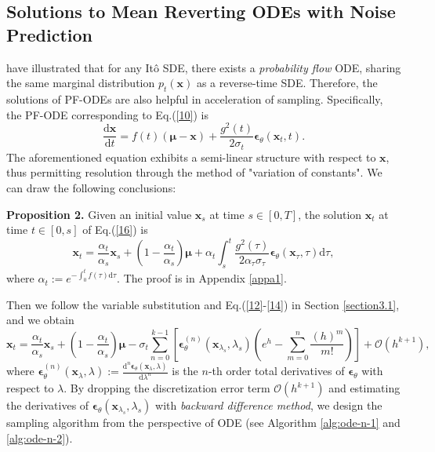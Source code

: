 \subsection{Solutions to Mean Reverting ODEs with Noise Prediction}

\cite{song2020sde} have illustrated that for any Itô SDE, there exists a \textit{probability flow} ODE, sharing the same marginal distribution $p_t(\boldsymbol{x})$ as a reverse-time SDE. Therefore, the solutions of PF-ODEs are also helpful in acceleration of sampling. Specifically, the PF-ODE corresponding to Eq.(\ref{10}) is
\begin{equation}
\frac{\mathrm{d}\boldsymbol{x}}{\mathrm{d}t}=f(t)\left(\boldsymbol{\mu}-\boldsymbol{x}\right)+\frac{g^2(t)}{2\sigma_t}\boldsymbol{\epsilon}_\theta(\boldsymbol{x}_t,t).
\label{16}
\end{equation}
The aforementioned equation exhibits a semi-linear structure with respect to $\boldsymbol{x}$, thus permitting resolution through the method of "variation of constants". We can draw the following conclusions:

\textbf{Proposition 2.} Given an initial value $\boldsymbol{x}_s$ at time $s\in[0,T]$, the solution $\boldsymbol{x}_t$ at time $t\in[0,s]$ of Eq.(\ref{16}) is 
\begin{equation}
\boldsymbol{x}_t=\frac{\alpha_t}{\alpha_s}\boldsymbol{x}_s+\left(1-\frac{\alpha_t}{\alpha_s}\right)\boldsymbol{\mu}+\alpha_t\int_s^t
\frac{g^2(\tau)}{2\alpha_\tau\sigma_\tau}\boldsymbol{\epsilon}_\theta(\boldsymbol{x}_\tau,\tau)\mathrm{d}\tau \label{17},
\end{equation}
where $\alpha_t:=e^{-\int_0^tf(\tau)\mathrm{d}\tau}$. The proof is in Appendix \ref{appa1}.

Then we follow the variable substitution and Eq.(\ref{12}-\ref{14}) in Section \ref{section3.1}, and we obtain
\begin{equation}
\boldsymbol{x}_t=\frac{\alpha_t}{\alpha_s}\boldsymbol{x}_s+\left(1-\frac{\alpha_t}{\alpha_s}\right)\boldsymbol{\mu}-\sigma_{t}\sum_{n=0}^{k-1}\left[\boldsymbol{\epsilon}_\theta^{(n)}(\boldsymbol{x}_{\lambda_{s}},\lambda_{s})\left(e^{h}-\sum_{m=0}^n\frac{(h)^m}{m!}\right)\right]
+\mathcal{O}(h^{k+1}),
\label{18}
\end{equation}
where $\boldsymbol{\epsilon}_\theta^{(n)}(\boldsymbol{x}_\lambda,\lambda):=\frac{\mathrm{d}^{n}\boldsymbol{\epsilon}_\theta(\boldsymbol{x}_{\lambda},\lambda)}{\mathrm{d}\lambda^n}$ is the $n$-th order total derivatives of $\boldsymbol{\epsilon}_\theta$ with respect to $\lambda$. By dropping the discretization error term $\mathcal{O}(h^{k+1})$ and estimating the derivatives of $\boldsymbol{\epsilon}_\theta(\boldsymbol{x}_{\lambda_{s}},\lambda_{s})$ with \textit{backward difference method}, we design the sampling algorithm from the perspective of ODE (see Algorithm \ref{alg:ode-n-1} and \ref{alg:ode-n-2}). 


